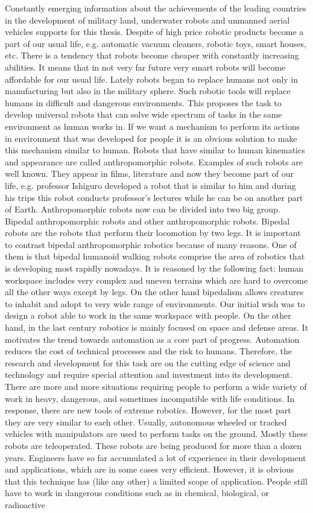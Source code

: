 \documentclass[12pt,a4paper]{report}
\begin{document}
		Constantly emerging information about the achievements of the leading countries in the development of military land, underwater robots and unmanned aerial vehicles supports for this thesis. Despite of high price robotic products become a part of our usual life, e.g. automatic vacuum cleaners, robotic toys, smart houses, etc.
		There is a tendency that robots become cheaper with constantly increasing abilities. It means that in not very far future very smart robots will become affordable for our usual life. Lately robots began to replace humans not only in manufacturing but also in the military sphere.
		Such robotic tools will replace humans in difficult and dangerous environments. This proposes the task to develop universal robots that can solve wide spectrum of tasks in the same environment as human works in. If we want a mechanism to perform its actions in environment that was developed for people it is an obvious solution to make this mechanism similar to human. Robots that have similar to human kinematics and appearance are called anthropomorphic robots. Examples of such robots are well known. They appear in films, literature and now they become part of our life, e.g. professor Ishiguro developed a robot that is similar to him and during his trips this robot conducts professor's lectures while he can be on another part of Earth. Anthropomorphic robots now can be divided into two big group. Bipedal anthropomorphic robots and other anthropomorphic robots. Bipedal robots are the robots that perform their locomotion by two legs. It is important to contrast bipedal anthropomorphic robotics because of many reasons. One of them is that bipedal humanoid walking robots comprise the area of robotics that is developing most rapidly nowadays. It is reasoned by the following fact: human workspace includes very complex and uneven terrains which are hard to overcome all the other ways except by legs. On the other hand bipedalism allows creatures to inhabit and adopt to very wide range of environments. Our initial wish was to design a robot able to work in the same workspace with people. On the other hand, in the last century robotics is mainly focused on space and defense areas. It motivates the trend towards automation as a core part of progress. Automation reduces the cost of technical processes and the risk to humans. Therefore, the research and development for this task are on the cutting edge of science and technology and require special attention and investment into its development. There are more and more situations requiring people to perform a wide variety of work in heavy, dangerous, and sometimes incompatible with life conditions. In response, there are new tools of extreme robotics. However, for the most part they are very similar to each other. Usually, autonomous wheeled or tracked vehicles with manipulators are used to perform tasks on the ground. Mostly these robots are teleoperated. These robots are being produced for more than a dozen years. Engineers have so far accumulated a lot of experience in their development and applications, which are in some cases very efficient. However, it is obvious that this technique has (like any other) a limited scope of application. People still have to work in dangerous conditions such as in chemical, biological, or radioactive 
\end{document}
